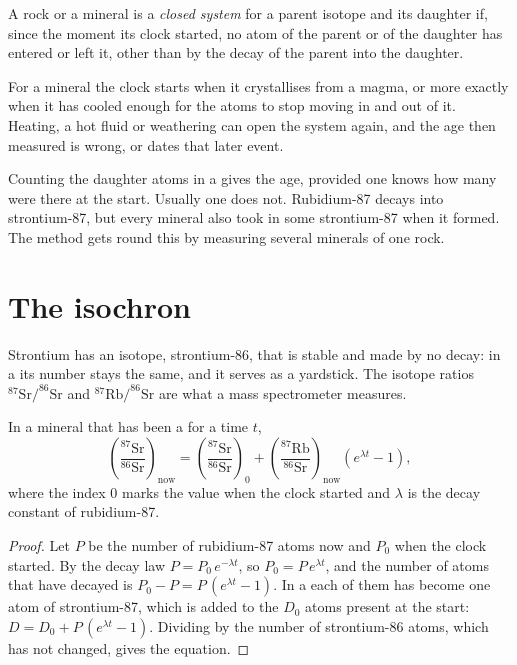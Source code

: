 \begin{definition}\label{def:g12:age-of-the-earth:closed-system}
A rock or a mineral is a \emph{closed system} for a
parent isotope and its daughter if, since the moment its clock started,
no atom of the parent or of the daughter has entered or left it, other than
by the decay of the parent into the daughter.
\end{definition}

For a mineral the clock starts when it crystallises from a magma, or more
exactly when it has cooled enough for the atoms to stop moving in and out of
it. Heating, a hot
fluid or weathering can open the system again, and the age then measured is
wrong, or dates that later event.

Counting the daughter atoms in a  gives the age, provided one
knows how many were there at the start. Usually one does not. Rubidium-87
decays into strontium-87, but every mineral also took in some strontium-87
when it formed. The  method gets round this by measuring several
minerals of one rock.

\section{The isochron}

Strontium has an isotope, strontium-86, that is stable and made by no
decay: in a  its number stays the same, and it serves as a
yardstick. The isotope ratios $^{87}\mathrm{Sr}/^{86}\mathrm{Sr}$ and
$^{87}\mathrm{Rb}/^{86}\mathrm{Sr}$ are what a mass spectrometer measures.

\begin{theorem}\label{thm:g12:age-of-the-earth:isochron}
In a mineral that has been a  for a time $t$,
\[
  \left(\frac{^{87}\mathrm{Sr}}{^{86}\mathrm{Sr}}\right)_{\text{now}}
  = \left(\frac{^{87}\mathrm{Sr}}{^{86}\mathrm{Sr}}\right)_{0}
  + \left(\frac{^{87}\mathrm{Rb}}{^{86}\mathrm{Sr}}\right)_{\text{now}}
  \left(e^{\lambda t} - 1\right),
\]
where the index 0 marks the value when the clock started and $\lambda$ is
the decay constant of rubidium-87.
\end{theorem}

\begin{proof}
Let $P$ be the number of rubidium-87 atoms now and $P_0$ when the clock
started. By the decay law $P = P_0\,e^{-\lambda t}$, so $P_0 = P\,e^{\lambda t}$,
and the number of atoms that have decayed is $P_0 - P = P\,(e^{\lambda t}-1)$.
In a  each of them has become one atom of strontium-87, which
is added to the $D_0$ atoms present at the start: $D = D_0 + P\,(e^{\lambda
t}-1)$. Dividing by the number of strontium-86 atoms, which has not changed,
gives the equation.
\end{proof}

